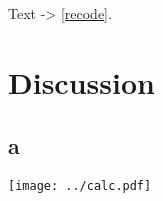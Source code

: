 \documentclass[12pt,letterpaper]{extarticle}
\title{ }
\begin{document}
\setcounter{page}{1}


Text -> \autoref{recode}.

\section{Discussion}




\clearpage
\begin{appendices}

\section{a}\label{recode}


\centering\texttt{[image: ../calc.pdf]}
\end{appendices}
\end{document}

